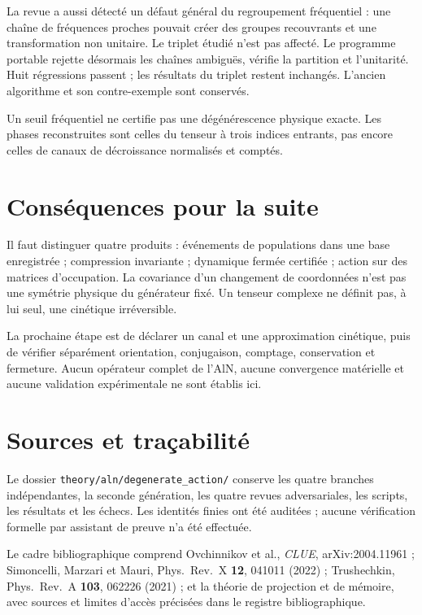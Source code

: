 \documentclass[11pt,a4paper]{article}
\begin{document}
La revue a aussi détecté un défaut général du regroupement fréquentiel :
une chaîne de fréquences proches pouvait créer des groupes recouvrants
et une transformation non unitaire. Le triplet étudié n'est pas affecté.
Le programme portable rejette désormais les chaînes ambiguës, vérifie
la partition et l'unitarité. Huit régressions passent ; les résultats du
triplet restent inchangés. L'ancien algorithme et son contre-exemple
sont conservés.

Un seuil fréquentiel ne certifie pas une dégénérescence physique exacte.
Les phases reconstruites sont celles du tenseur à trois indices entrants,
pas encore celles de canaux de décroissance normalisés et comptés.

\section{Conséquences pour la suite}
Il faut distinguer quatre produits : événements de populations dans
une base enregistrée ; compression invariante ; dynamique fermée
certifiée ; action sur des matrices d'occupation.
La covariance d'un changement de coordonnées n'est pas une symétrie
physique du générateur fixé. Un tenseur complexe ne définit pas, à lui
seul, une cinétique irréversible.

La prochaine étape est de déclarer un canal et une approximation
cinétique, puis de vérifier séparément orientation, conjugaison,
comptage, conservation et fermeture. Aucun opérateur complet de l'AlN,
aucune convergence matérielle et aucune validation expérimentale ne
sont établis ici.

\section{Sources et traçabilité}
Le dossier \texttt{theory/aln/degenerate\_action/} conserve les quatre
branches indépendantes, la seconde génération, les quatre revues
adversariales, les scripts, les résultats et les échecs.
Les identités finies ont été auditées ; aucune vérification formelle
par assistant de preuve n'a été effectuée.

Le cadre bibliographique comprend Ovchinnikov et al.,
\emph{CLUE}, arXiv:2004.11961 ; Simoncelli, Marzari et Mauri,
Phys.\ Rev.\ X \textbf{12}, 041011 (2022) ; Trushechkin,
Phys.\ Rev.\ A \textbf{103}, 062226 (2021) ; et la théorie de
projection et de mémoire, avec sources et limites d'accès précisées
dans le registre bibliographique.
\end{document}
